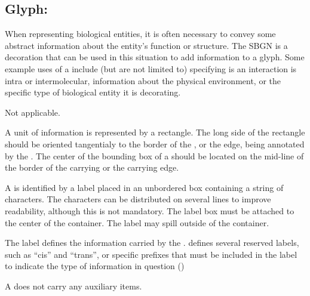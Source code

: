 \color{blue}

\subsection{Glyph: }
\label{sec:unitInformation}

When representing biological entities, it is often necessary to convey some abstract information about the entity's function or structure.  The SBGN  is a decoration that can be used in this situation to add information to a glyph.  Some example uses of a  include (but are not limited to) specifying is an interaction is intra or intermolecular, information about the physical environment, or the specific type of biological entity it is decorating.

\begin{glyphDescription}

\glyphSboTerm Not applicable.

\glyphContainer A unit of information is represented by a rectangle.  The long side of the rectangle should be oriented tangentialy to the border of the , or the edge, being annotated by the . The center of the bounding box of a  should be located on the mid-line of the border of the carrying  or the carrying edge.

\glyphLabel A  is identified by a label placed in an unbordered box containing a string of characters.  The characters can be distributed on several lines to improve readability, although this is not mandatory.  The label box must be attached to the center of the container.  The label may spill outside of the container.

The label defines the information carried by the .  \SBGNERLone defines several reserved labels, such as ``cis'' and ``trans'', or specific prefixes that must be included in the label to indicate the type of information in question ()

\glyphAux A  does not carry any auxiliary items.

\end{glyphDescription}

